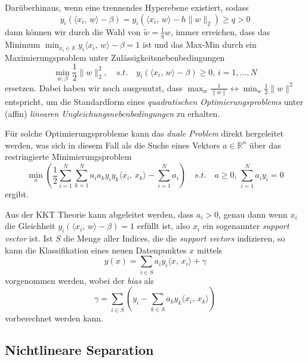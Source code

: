 \documentclass[
]{book}
\theoremstyle{definition}
\theoremstyle{definition}
\theoremstyle{definition}
\theoremstyle{definition}
\theoremstyle{remark}
\begin{document}
Darüberhinaus, wenn eine trennendes Hyperebene existiert, sodass
\begin{equation*}
y_i(\bigl \langle x_i, \, w\bigr\rangle -\beta) = y_i(\bigl \langle x_i, \, w\bigr\rangle  -h \|w\|_2) \geq q > 0
\end{equation*}
dann können wir durch die Wahl von \(\tilde w =\frac 1q w\), immer
erreichen, dass das Minimum \(\min_{ x_i \in \mathbb X} y_i \bigl \langle x_i, \, w\bigr\rangle -\beta=1\) ist und das Max-Min durch ein Maximierungsproblem unter Zulässigkeitsnebenbedingungen
\begin{equation*}
\min_{w,\beta} \frac 12 \|w\|_2^2, \quad{s.t.}\quad y_i(\bigl \langle x_i, \, w\bigr\rangle -\beta) \geq 0, \,
i=1,\dotsc, N
\end{equation*}
ersetzen. Dabei haben wir noch ausgenutzt, dass \(\max_w \frac 1{\|w\|}\leftrightarrow \min_w \frac 12 \|w\|^2\) entspricht, um die Standardform
eines \emph{quadratischen Optimierungsproblems} unter (affin) \emph{linearen
Ungleichungsnebenbedingungen} zu erhalten.

Für solche Optimierungsprobleme kann das \emph{duale Problem} direkt hergeleitet
werden, was sich in diesem Fall als die Suche eines Vektors \(a\in \mathbb R^{n}\)
über das restringierte Minimierungsproblem
\begin{equation*}
\min_{a} \left(\frac 12 \sum_{i=1}^N\sum_{k=1}^Na_ia_k y_i y_k \bigl \langle x_i, \, x_k\bigr\rangle  -
\sum_{i=1}^N a_i\right) \quad{s.t.}\quad a\geq0, \, \sum_{i=1}^Na_iy_i=0
\end{equation*}
ergibt.

Aus der KKT Theorie kann abgeleitet werden, dass \(a_i>0\), genau dann wenn \(x_i\)
die Gleichheit \(y_i(\bigl \langle x_i, \, w\bigr\rangle -\beta)=1\) erfüllt ist, also \(x_i\) ein
sogenannter \emph{support vector} ist. Ist \(S\) die Menge aller Indices, die die
\emph{support vectors} indizieren, so kann die Klassifikation eines neuen
Datenpunktes \(x\) mittels
\begin{equation*}
y(x) = \sum_{i\in S}a_iy_i\bigl \langle x, \, x_i\bigr\rangle +\gamma
\end{equation*}
vorgenommen werden, wobei der \emph{bias} als
\begin{equation*}
\gamma = \sum_{i\in S}(y_i - \sum_{k\in S}a_ky_k\bigl \langle x_i, \, x_k\bigr\rangle )
\end{equation*}
vorberechnet werden kann.

\hypertarget{nichtlineare-separation}{%
\subsection{Nichtlineare Separation}\label{nichtlineare-separation}}
\end{document}
